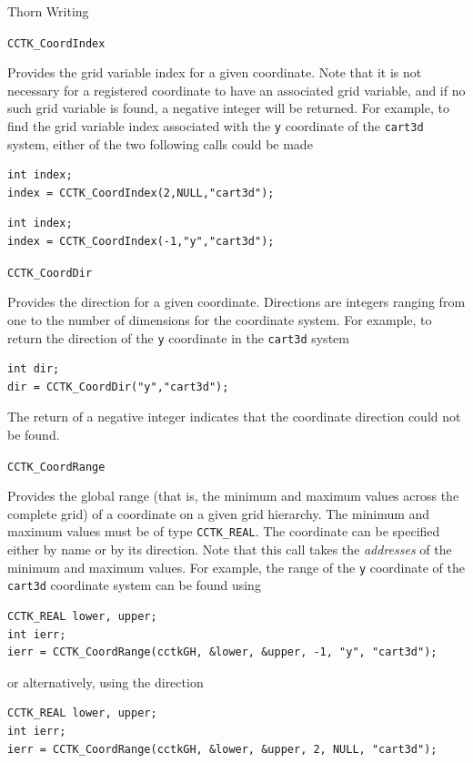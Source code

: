 \begin{cactuspart}{Thorn Writing}
\begin{Lentry}
\item[\texttt{CCTK\_CoordIndex}]

Provides the grid variable index for a given coordinate. Note that it is
not necessary for a registered coordinate to have an associated grid variable,
and if no such grid variable is found, a negative integer will be returned.
For example, to find the grid variable index associated with the \texttt{y}
coordinate of the \texttt{cart3d} system, either of the two following
calls could be made
%
\begin{verbatim}
int index;
index = CCTK_CoordIndex(2,NULL,"cart3d");
\end{verbatim}
%
\begin{verbatim}
int index;
index = CCTK_CoordIndex(-1,"y","cart3d");
\end{verbatim}


\item[\texttt{CCTK\_CoordDir}]

Provides the direction for a given coordinate. Directions are integers
ranging from one to the number of dimensions for the coordinate system.
For example, to return the direction of the \texttt{y} coordinate in
the \texttt{cart3d} system
%
\begin{verbatim}
int dir;
dir = CCTK_CoordDir("y","cart3d");
\end{verbatim}

The return of a negative integer indicates that the coordinate direction
could not be found.

\item[\texttt{CCTK\_CoordRange}]

Provides the global range (that is, the minimum and maximum values across
the complete grid) of a coordinate on a given grid hierarchy. The minimum and maximum values must be of type \texttt{CCTK\_REAL}. The
coordinate can be specified either by name or by its direction. Note that
this call takes the \emph{addresses} of the minimum and maximum values.
For example, the range of the \texttt{y} coordinate of the \texttt{cart3d}
coordinate system can be found using
%
\begin{verbatim}
CCTK_REAL lower, upper;
int ierr;
ierr = CCTK_CoordRange(cctkGH, &lower, &upper, -1, "y", "cart3d");
\end{verbatim}
or alternatively, using the direction
%
\begin{verbatim}
CCTK_REAL lower, upper;
int ierr;
ierr = CCTK_CoordRange(cctkGH, &lower, &upper, 2, NULL, "cart3d");
\end{verbatim}



\end{Lentry}
\end{cactuspart}
